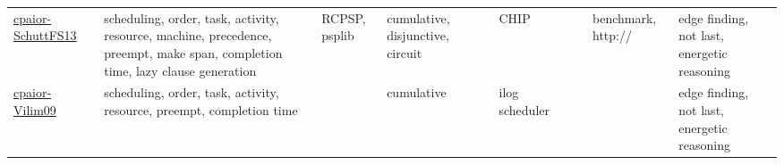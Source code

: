{\begin{longtable}{p{3cm}p{4cm}p{2cm}p{2cm}p{2cm}p{2cm}p{2cm}p{2cm}p{2cm}p{2cm}}
\href{papers/cpaior-SchuttFS13.pdf}{cpaior-SchuttFS13}~\cite{cpaior-SchuttFS13} & scheduling, order, task, activity, resource, machine, precedence, preempt, make span, completion time, lazy clause generation & RCPSP, psplib & cumulative, disjunctive, circuit &  & CHIP &  &  & benchmark, http:// & edge finding, not last, energetic reasoning\\
\href{papers/cpaior-Vilim09.pdf}{cpaior-Vilim09}~\cite{cpaior-Vilim09} & scheduling, order, task, activity, resource, preempt, completion time &  & cumulative &  & ilog scheduler &  &  &  & edge finding, not last, energetic reasoning\\
\end{longtable}
}

